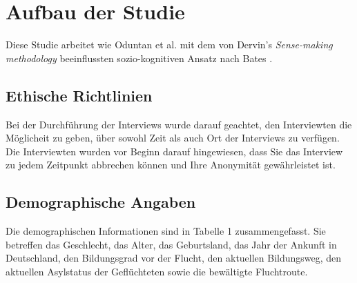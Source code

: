 \section{Aufbau der Studie}
Diese Studie arbeitet wie Oduntan et al. \citep{oduntan2017investigating} mit dem von Dervin's \textit{Sense-making methodology} beeinflussten sozio-kognitiven Ansatz nach Bates \citep{bates2005introduction}.

\subsection{Ethische Richtlinien}

Bei der Durchführung der Interviews wurde darauf geachtet, den Interviewten die Möglicheit zu geben, über sowohl Zeit als auch Ort der Interviews zu verfügen. Die Interviewten wurden vor Beginn darauf hingewiesen, dass Sie das Interview zu jedem Zeitpunkt abbrechen können und Ihre Anonymität gewährleistet ist.\newline

\subsection{Demographische Angaben}

Die demographischen Informationen sind in Tabelle 1 zusammengefasst. Sie betreffen das Geschlecht, das Alter, das Geburtsland, das Jahr der Ankunft in Deutschland, den Bildungsgrad vor der Flucht, den aktuellen Bildungsweg, den aktuellen Asylstatus der Geflüchteten sowie die bewältigte Fluchtroute.

